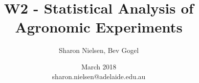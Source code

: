 
%
%



\usepackage{hyperref}
\usepackage{multirow}
\usepackage{graphics}
\usepackage{epsfig}
\usepackage{verbatim}
\usepackage{fancyvrb}
\usepackage{shortvrb}
\usepackage{moreverb}
\usepackage[dvips]{rotating}
\usepackage{pifont}
\usepackage{tikz}
\usepackage{apacite}
\usepackage{booktabs}
\newcommand{\head}[1]{\textnormal{\textbf{#1}}}


\usepackage{setspace}
\usepackage{graphicx}
\usepackage{amsmath}
\usepackage{multicol}
\usepackage{wasysym}
\usepackage{colortbl}


\usepackage[light]{iwona}
\usepackage[T1]{fontenc}

\usepackage{listings}%
\lstset{
  basicstyle=\ttfamily,
  mathescape
}



\title[W1 - Analysis]{W2 - Statistical Analysis of Agronomic Experiments}
\author{Sharon Nielsen, Bev Gogel}
\date{March 2018 \\ \vspace{0.2cm}\footnotesize  sharon.nielsen@adelaide.edu.au}




\begin{frame}
\titlepage
\end{frame}



